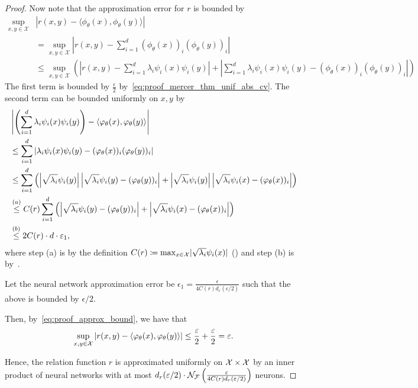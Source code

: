 \begin{proof}
	Now note that the approximation error for \(r\) is bounded by
	\begin{equation}\label{eq:proof_approx_bound}
		\begin{split}
			\sup_{x, y \in \mathcal{X}}&{
				\left\lvert r(x,y) - \langle \phi_\theta(x), \phi_\theta(y) \rangle \right\rvert}\\
			&= \sup_{x, y \in \mathcal{X}}{
				\left\lvert r(x,y) - \sum_{i=1}^{d}{(\phi_\theta(x))_i (\phi_\theta(y))_i} \right\rvert} \\
			&\leq \sup_{x,y \in \mathcal{X}}{ \left(
				\left\lvert r(x,y) - \sum_{i=1}^{d}{\lambda_i \psi_i(x) \psi_i(y)} \right\rvert
				+ \left\lvert \sum_{i=1}^{d}{\lambda_i \psi_i(x) \psi_i(y) - (\phi_\theta(x))_i (\phi_\theta(y))_i} \right\rvert  \right) }
		\end{split}
	\end{equation}
	The first term is bounded by \(\frac{\epsilon}{2}\) by~\eqref{eq:proof_mercer_thm_unif_abs_cv}. The second term can be bounded uniformly on \(x,y\) by
	\begin{equation*}
		\begin{split}
			&\left\lvert \left(\sum_{i=1}^{d}{\lambda_i \psi_i(x) \psi_i(y)}\right) - \langle \phi_\theta(x), \phi_\theta(y) \rangle \right\rvert  \\
			&\leq \sum_{i=1}^{d}{ \abs{ \lambda_i \psi_i(x) \psi_i(y) - (\phi_\theta(x))_i (\phi_\theta(y))_i}} \\
			&\leq \sum_{i=1}^{d}{\paren{
				\abs{\sqrt{\lambda_i} \psi_i(y)} \abs{\sqrt{\lambda_i} \psi_i(y) - (\phi_\theta(y))_i}
				+ \abs{\sqrt{\lambda_i} \psi_i(y)} \abs{\sqrt{\lambda_i} \psi_i(x) - (\phi_\theta(x))_i}
				}} \\
			&\stepa{\leq} C(r) \sum_{i=1}^{d}{\paren{
				\abs{\sqrt{\lambda_i} \psi_i(y) - (\phi_\theta(y))_i}
				+ \abs{\sqrt{\lambda_i} \psi_i(x) - (\phi_\theta(x))_i}
				}} \\
			&\stepb{\leq} 2 C(r) \cdot d \cdot \epsilon_1,
		\end{split}
	\end{equation*}
	where step (a) is by the definition $C(r) \coloneqq \max_{x \in {\mathcal{X}}} \lvert \sqrt{\lambda_i} \psi_i(x) \rvert$ () and step (b) is by~.

	Let the neural network approximation error be $\epsilon_1 = \frac{\epsilon}{4 C(r) d_r(\epsilon / 2)}$ such that the above is bounded by $\epsilon / 2$. 

	Then, by~\eqref{eq:proof_approx_bound}, we have that
	\begin{equation*}
		\sup_{x, y \in \mathcal{X}}{
			\abs{r(x,y) - \iprod{\phi_\theta(x)}{\phi_\theta(y)}}} \leq \frac{\epsilon}{2} + \frac{\epsilon}{2} = \epsilon.
	\end{equation*}

	Hence, the relation function $r$ is approximated uniformly on ${\mathcal{X}} \times {\mathcal{X}}$ by an inner product of neural networks with at most $d_r(\varepsilon / 2) \cdot {\mathcal{N}}_{\mathcal{F}}\left(\frac{\varepsilon}{4 C(r) d_r(\varepsilon / 2)}\right)$ neurons.

\end{proof}

